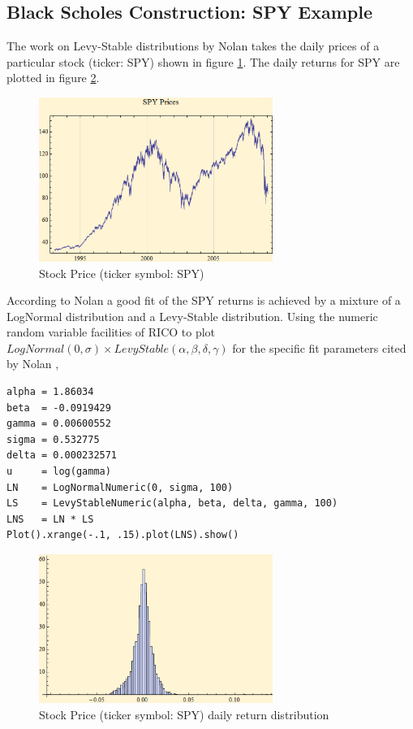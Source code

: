 \subsection{Black Scholes Construction: SPY Example}

The work on Levy-Stable distributions by Nolan \cite{nolan13} takes the daily prices of a particular stock (ticker: SPY) shown in figure \ref{fig:SPY}. The daily returns for SPY are plotted in figure \ref{fig:SPY_returns}.

\begin{figure}
  \centering
  \includegraphics[width=3in]{Images/SPY.eps}
  \caption[Stock Price (ticker symbol: SPY)]
          {Stock Price (ticker symbol: SPY)}
  \label{fig:SPY}
\end{figure}

According to Nolan \cite{nolan13} a good fit of the SPY returns is achieved by a mixture of a LogNormal distribution and a Levy-Stable distribution. Using the numeric random variable facilities of RICO to plot $LogNormal(0,\sigma) \times LevyStable(\alpha, \beta, \delta, \gamma)$ for the specific fit parameters cited by Nolan \cite{nolan13},
\begin{lstlisting}
alpha = 1.86034
beta  = -0.0919429
gamma = 0.00600552
sigma = 0.532775
delta = 0.000232571
u     = log(gamma)
LN    = LogNormalNumeric(0, sigma, 100)
LS    = LevyStableNumeric(alpha, beta, delta, gamma, 100)
LNS   = LN * LS
Plot().xrange(-.1, .15).plot(LNS).show()
\end{lstlisting}

\begin{figure}
  \centering
  \includegraphics[width=3in]{Images/SPY_returns.eps}
  \caption[Stock Price (ticker symbol: SPY) daily return distribution]
          {Stock Price (ticker symbol: SPY) daily return distribution}
  \label{fig:SPY_returns}
\end{figure}

